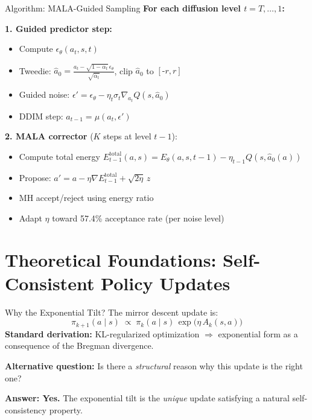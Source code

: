 \documentclass[aspectratio=169,11pt]{beamer}
\begin{document}
\begin{frame}{Algorithm: MALA-Guided Sampling}
\textbf{For each diffusion level $t = T, \ldots, 1$:}
\smallskip

\textbf{1. Guided predictor step:}
\begin{itemize}\setlength\itemsep{2pt}
  \item[\tiny$\blacktriangleright$] Compute $\epsilon_\theta(a_t, s, t)$
  \item[\tiny$\blacktriangleright$] Tweedie: $\hat{a}_0 = \frac{a_t - \sqrt{1-\bar\alpha_t}\,\epsilon_\theta}{\sqrt{\bar\alpha_t}}$, \quad clip $\hat{a}_0$ to $[\text{-}r, r]$
  \item[\tiny$\blacktriangleright$] Guided noise: $\epsilon' = \epsilon_\theta - \eta_t \sigma_t \nabla_{a_t} Q(s, \hat{a}_0)$
  \item[\tiny$\blacktriangleright$] DDIM step: $a_{t-1} = \mu(a_t, \epsilon')$ 
\end{itemize}

\smallskip
\textbf{2. MALA corrector} ($K$ steps at level $t{-}1$):
\begin{itemize}\setlength\itemsep{2pt}
  \item[\tiny$\blacktriangleright$] Compute total energy $E_{t-1}^{\text{total}}(a, s) = E_\theta(a,s,t{-}1) - \eta_{t-1} Q(s, \hat{a}_0(a))$
  \item[\tiny$\blacktriangleright$] Propose: $a' = a - \eta\nabla E_{t-1}^{\text{total}} + \sqrt{2\eta}\,z$
  \item[\tiny$\blacktriangleright$] MH accept/reject using energy ratio
  \item[\tiny$\blacktriangleright$] Adapt $\eta$ toward 57.4\% acceptance rate (per noise level)
\end{itemize}
\end{frame}

\section{Theoretical Foundations: Self-Consistent Policy Updates}

\begin{frame}{Why the Exponential Tilt?}
The mirror descent update is:
\[
  \pi_{k+1}(a \mid s) \;\propto\; \pi_k(a \mid s)\,\exp\!\big(\eta\, A_k(s,a)\big)
\]
\textbf{Standard derivation:} KL-regularized optimization $\Rightarrow$ exponential form as a consequence of the Bregman divergence.

\pause
\medskip
\textbf{Alternative question:} Is there a \emph{structural} reason why this update is the right one?

\pause
\medskip
\textbf{Answer: Yes.} The exponential tilt is the \emph{unique} update satisfying a natural self-consistency property.
\end{frame}
\end{document}
